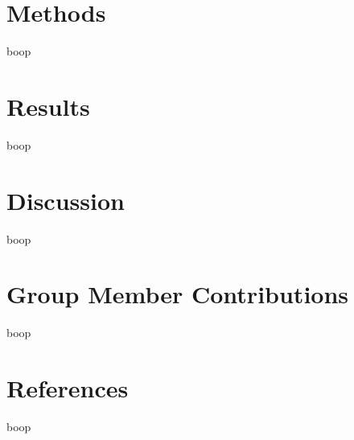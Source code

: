 \documentclass[letterpaper]{article} %
\begin{document}
\section{Methods}
boop


\section{Results}
boop

\section{Discussion}
boop

\section{Group Member Contributions}
boop

\section{References}
boop
\end{document}
